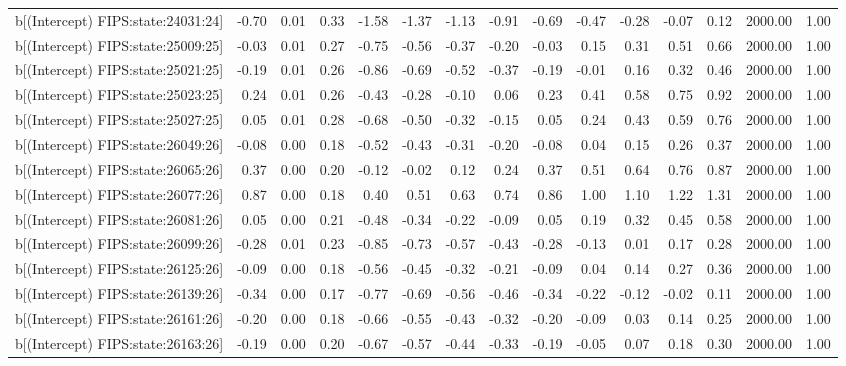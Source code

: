 \begin{table}[ht]
\begin{tabular}{rrrrrrrrrrrrrrr}
  b[(Intercept) FIPS:state:24031:24] & -0.70 & 0.01 & 0.33 & -1.58 & -1.37 & -1.13 & -0.91 & -0.69 & -0.47 & -0.28 & -0.07 & 0.12 & 2000.00 & 1.00 \\ 
  b[(Intercept) FIPS:state:25009:25] & -0.03 & 0.01 & 0.27 & -0.75 & -0.56 & -0.37 & -0.20 & -0.03 & 0.15 & 0.31 & 0.51 & 0.66 & 2000.00 & 1.00 \\ 
  b[(Intercept) FIPS:state:25021:25] & -0.19 & 0.01 & 0.26 & -0.86 & -0.69 & -0.52 & -0.37 & -0.19 & -0.01 & 0.16 & 0.32 & 0.46 & 2000.00 & 1.00 \\ 
  b[(Intercept) FIPS:state:25023:25] & 0.24 & 0.01 & 0.26 & -0.43 & -0.28 & -0.10 & 0.06 & 0.23 & 0.41 & 0.58 & 0.75 & 0.92 & 2000.00 & 1.00 \\ 
  b[(Intercept) FIPS:state:25027:25] & 0.05 & 0.01 & 0.28 & -0.68 & -0.50 & -0.32 & -0.15 & 0.05 & 0.24 & 0.43 & 0.59 & 0.76 & 2000.00 & 1.00 \\ 
  b[(Intercept) FIPS:state:26049:26] & -0.08 & 0.00 & 0.18 & -0.52 & -0.43 & -0.31 & -0.20 & -0.08 & 0.04 & 0.15 & 0.26 & 0.37 & 2000.00 & 1.00 \\ 
  b[(Intercept) FIPS:state:26065:26] & 0.37 & 0.00 & 0.20 & -0.12 & -0.02 & 0.12 & 0.24 & 0.37 & 0.51 & 0.64 & 0.76 & 0.87 & 2000.00 & 1.00 \\ 
  b[(Intercept) FIPS:state:26077:26] & 0.87 & 0.00 & 0.18 & 0.40 & 0.51 & 0.63 & 0.74 & 0.86 & 1.00 & 1.10 & 1.22 & 1.31 & 2000.00 & 1.00 \\ 
  b[(Intercept) FIPS:state:26081:26] & 0.05 & 0.00 & 0.21 & -0.48 & -0.34 & -0.22 & -0.09 & 0.05 & 0.19 & 0.32 & 0.45 & 0.58 & 2000.00 & 1.00 \\ 
  b[(Intercept) FIPS:state:26099:26] & -0.28 & 0.01 & 0.23 & -0.85 & -0.73 & -0.57 & -0.43 & -0.28 & -0.13 & 0.01 & 0.17 & 0.28 & 2000.00 & 1.00 \\ 
  b[(Intercept) FIPS:state:26125:26] & -0.09 & 0.00 & 0.18 & -0.56 & -0.45 & -0.32 & -0.21 & -0.09 & 0.04 & 0.14 & 0.27 & 0.36 & 2000.00 & 1.00 \\ 
  b[(Intercept) FIPS:state:26139:26] & -0.34 & 0.00 & 0.17 & -0.77 & -0.69 & -0.56 & -0.46 & -0.34 & -0.22 & -0.12 & -0.02 & 0.11 & 2000.00 & 1.00 \\ 
  b[(Intercept) FIPS:state:26161:26] & -0.20 & 0.00 & 0.18 & -0.66 & -0.55 & -0.43 & -0.32 & -0.20 & -0.09 & 0.03 & 0.14 & 0.25 & 2000.00 & 1.00 \\ 
  b[(Intercept) FIPS:state:26163:26] & -0.19 & 0.00 & 0.20 & -0.67 & -0.57 & -0.44 & -0.33 & -0.19 & -0.05 & 0.07 & 0.18 & 0.30 & 2000.00 & 1.00 \\ 

\end{tabular}
\end{table}
